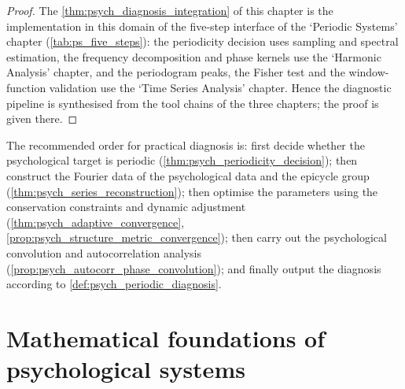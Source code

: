 \begin{proof}
The \cref{thm:psych_diagnosis_integration} of this chapter is the implementation in this domain of the five-step interface of the `Periodic Systems' chapter (\cref{tab:ps_five_steps}):
the periodicity decision uses sampling and spectral estimation, the frequency decomposition and phase kernels use the `Harmonic Analysis' chapter, and the periodogram peaks, the Fisher test and the
window-function validation use the `Time Series Analysis' chapter. Hence the diagnostic pipeline is synthesised from the tool chains of the three chapters; the proof is given there.
\end{proof}

\begin{remark}\label{rem:psych_integration_order}
The recommended order for practical diagnosis is: first decide whether the psychological target is periodic (\cref{thm:psych_periodicity_decision}); then construct the Fourier data of the psychological data and the epicycle group (\cref{thm:psych_series_reconstruction}); then optimise the parameters using the conservation constraints and dynamic adjustment (\cref{thm:psych_adaptive_convergence}, \cref{prop:psych_structure_metric_convergence}); then carry out the psychological convolution and autocorrelation analysis (\cref{prop:psych_autocorr_phase_convolution}); and finally output the diagnosis according to \cref{def:psych_periodic_diagnosis}.
\end{remark}

\section{Mathematical foundations of psychological systems}

